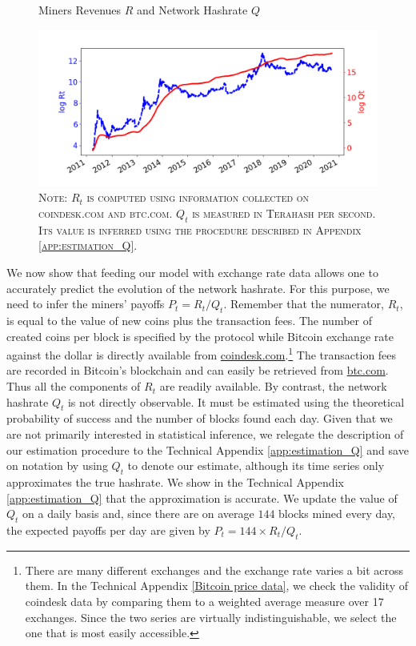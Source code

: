 \documentclass[12pt, a4paper]{article}
\makeatletter
\renewcommand{\subsection}{\@startsection{subsection}{2}{0mm}{-0.8\baselineskip}{.5\baselineskip}{\normalfont\normalsize\bfseries}}
\makeatother
\begin{document}
\label{sec:calibration}

\subsection{Data}
\label{ssec:Data}

\begin{figure}[t]
\caption{Miners Revenues $R$ and Network Hashrate $Q$}
\label{fig:R-Q}
\centering
\includegraphics[scale=0.575]{images/R_Q.png}
\caption*{\footnotesize{\textsc{Note: $R_t$ is computed using information collected on coindesk.com and btc.com. $Q_t$
is measured in Terahash per second. Its value is inferred using the procedure described in Appendix \ref{app:estimation_Q}.}}}
\end{figure}

We now show that feeding our model with exchange rate data
allows one to accurately predict the evolution of the network hashrate. For
this purpose, we need to infer the miners' payoffs $P_t=R_t/Q_t$. Remember
that the numerator, $R_t$, is equal to the value of new coins plus the
transaction fees. The number of created coins per block is specified by the
protocol while Bitcoin exchange rate against the dollar is directly available from \href{https://www.coindesk.com}%
{coindesk.com}.\footnote{%
There are many different exchanges and the exchange rate varies a bit across
them. In the Technical Appendix \ref{Bitcoin price data}, we check the validity of coindesk data by comparing them
to a weighted average measure over 17 exchanges. Since the two series are virtually indistinguishable,
we select the one that is most easily accessible.} The transaction fees are recorded in Bitcoin's
blockchain and can easily be retrieved from \href{https://www.btc.com}{%
btc.com}. Thus all the components of $R_t$ are readily
available. By contrast, the network hashrate $%
Q_t$ is not directly observable. It must be estimated using the theoretical
probability of success and the number of blocks found each day. Given that
we are not primarily interested in statistical inference, we relegate the
description of our estimation procedure to the Technical Appendix \ref{app:estimation_Q}
and save on notation by using $Q_t$ to denote our estimate, although its
time series only approximates the true hashrate. We show in the Technical Appendix
\ref{app:estimation_Q} that the approximation is accurate. We update the value
of $Q_t$ on a daily basis and, since there are on average $144$ blocks mined
every day, the expected payoffs per day are given by $P_t=144 \times R_t/Q_t$.
\end{document}

